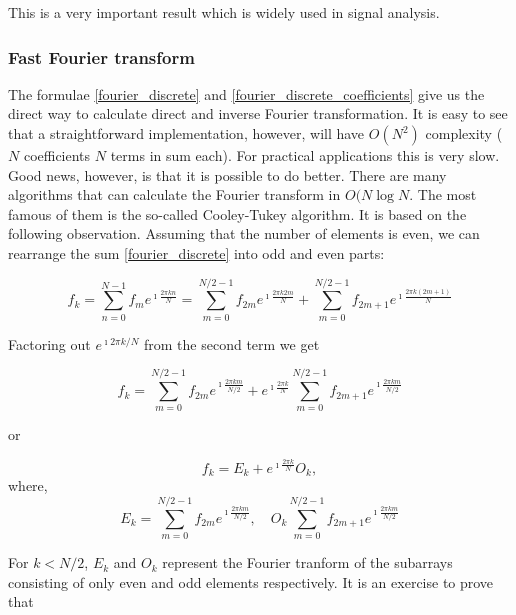 \documentclass[11pt]{book}
\begin{document}
This is a very important result which is widely used in signal analysis. 

\subsubsection{Fast Fourier transform}

The formulae \eqref{fourier_discrete} and \eqref{fourier_discrete_coefficients} give us the direct way to calculate direct and inverse Fourier transformation. It is easy to see that a straightforward implementation, however, will have $O(N^2)$ complexity ( $N$ coefficients $N$ terms in sum each). For practical applications this is very slow. Good news, however, is that it is possible to do better. There are many algorithms that can calculate the Fourier transform in $O(N\operatorname{log}{N}$. The most famous of them is the so-called Cooley-Tukey algorithm. It is based on the following observation. Assuming that the number of elements is even, we can rearrange the sum \eqref{fourier_discrete} into odd and even parts:


\begin{equation}
f_k = \sum\limits_{n=0}^{N-1} f_{m} e^{\imath \frac{2 \pi k n}{N}} = \sum\limits_{m=0}^{N/2 -1} f_{2m} e^{\imath \frac{2 \pi k 2 m}{N}} + \sum\limits_{m = 0}^{N / 2-1} f_{2m+1} e^{\imath \frac{2 \pi k (2 m + 1)}{N}}
\end{equation}

Factoring out $e^{\imath 2 \pi k /N}$ from the second term we get

\begin{equation}
f_k =  \sum\limits_{m=0}^{N/2 -1} f_{2m} e^{\imath \frac{2 \pi k m}{N / 2}} + e^{\imath \frac{2 \pi k}{N}}\sum\limits_{m = 0}^{N / 2 - 1} f_{2m+1} e^{\imath \frac{2 \pi k m }{N / 2}}\label{split_fft_oe}
\end{equation}

or

\begin{equation}
 f_k = E_{k} + e^{\imath \frac{2 \pi k}{N}} O_k, \label{k_sm_N2}
\end{equation}
where,
\begin{equation}
 E_k=\sum\limits_{m=0}^{N/2 -1} f_{2m} e^{\imath \frac{2 \pi k m}{N / 2}},\quad O_k \sum\limits_{m = 0}^{N / 2 - 1} f_{2m+1} e^{\imath \frac{2 \pi k m }{N / 2}}
\end{equation}

For $k<N/2$, $E_k$ and $O_k$ represent the Fourier tranform of the subarrays consisting of only even and odd elements respectively. 
It is an exercise to prove that
\end{document}
